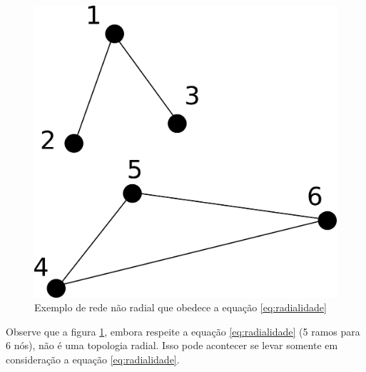 \begin{figure}[H]
    \centering
    \includegraphics[scale = 1]{01_img/restricao_fail.png}
    \caption{Exemplo de rede não radial que obedece a equação \ref{eq:radialidade}}
    \label{fig:radialidade_wrong}
\end{figure}

Observe que a figura \ref{fig:radialidade_wrong}, embora respeite a equação \ref{eq:radialidade} (5 ramos para 6 nós), não é uma topologia radial. Isso pode acontecer se levar somente em consideração a equação \ref{eq:radialidade}.

